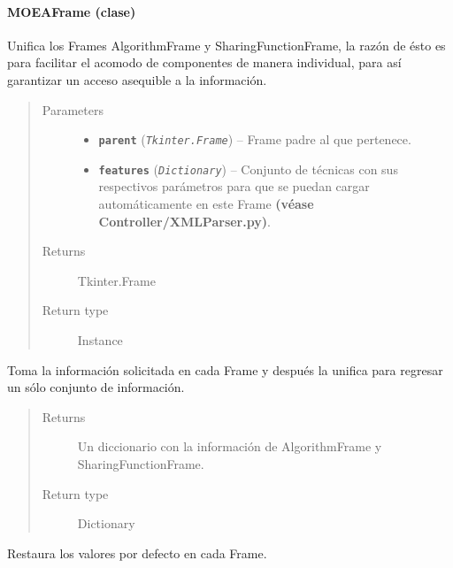 \documentclass[class=report, crop=false]{standalone}
\begin{document}
\paragraph{MOEAFrame (clase)}
\label{sec:a_3_2_6_1}
\begin{fulllineitems}

\begin{DUlineblock}{0em}
\item[] Unifica los Frames AlgorithmFrame y SharingFunctionFrame, 
la razón de ésto es para facilitar el acomodo de componentes 
de manera individual, para así garantizar un acceso asequible 
a la información.
\end{DUlineblock}

\begin{quote}\begin{description}
\item[{Parameters}] \leavevmode\begin{itemize}
\item \textbf{\texttt{parent}} (\emph{\texttt{Tkinter.Frame}}) -- Frame padre al que pertenece.
\item \textbf{\texttt{features}} (\emph{\texttt{Dictionary}}) -- Conjunto de técnicas con sus respectivos parámetros para que se puedan cargar automáticamente en este Frame \textbf{(véase Controller/XMLParser.py)}.
\end{itemize}

\item[{Returns}] \leavevmode
Tkinter.Frame
\item[{Return type}] \leavevmode
Instance
\end{description}\end{quote}


\begin{fulllineitems}

Toma la información solicitada en cada Frame y después
la unifica para regresar un sólo conjunto de información.

\begin{quote}\begin{description}
\item[{Returns}] \leavevmode
Un diccionario con la información de AlgorithmFrame y SharingFunctionFrame.
\item[{Return type}] \leavevmode
Dictionary
\end{description}\end{quote}
\end{fulllineitems}

\begin{fulllineitems}

Restaura los valores por defecto en cada Frame.

\end{fulllineitems}

\end{fulllineitems}
\end{document}
